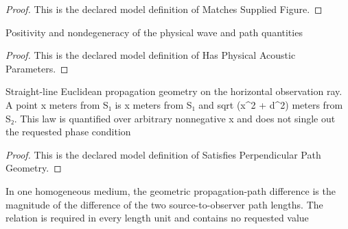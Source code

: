 \begin{proof}
  This is the declared model definition of Matches Supplied Figure.
\end{proof}
\begin{definition}
  \label{def:physics:phyx-mini-0316:phyxminiproblems-problemphyxmini0316-hasphysicalacousticparameters}
  Positivity and nondegeneracy of the physical wave and path quantities
\end{definition}
\begin{proof}
  This is the declared model definition of Has Physical Acoustic Parameters.
\end{proof}
\begin{definition}
  \label{def:physics:phyx-mini-0316:phyxminiproblems-problemphyxmini0316-satisfiesperpendicularpathgeometry}
  Straight-line Euclidean propagation geometry on the horizontal observation ray. A point x meters from S₁ is x meters from S₁ and sqrt (x\textasciicircum{}2 + d\textasciicircum{}2) meters from S₂. This law is quantified over arbitrary nonnegative x and does not single out the requested phase condition
\end{definition}
\begin{proof}
  This is the declared model definition of Satisfies Perpendicular Path Geometry.
\end{proof}
\begin{definition}
  \label{def:physics:phyx-mini-0316:phyxminiproblems-problemphyxmini0316-satisfiesgeometricpathdifferencelaw}
  In one homogeneous medium, the geometric propagation-path difference is the magnitude of the difference of the two source-to-observer path lengths. The relation is required in every length unit and contains no requested value
\end{definition}
